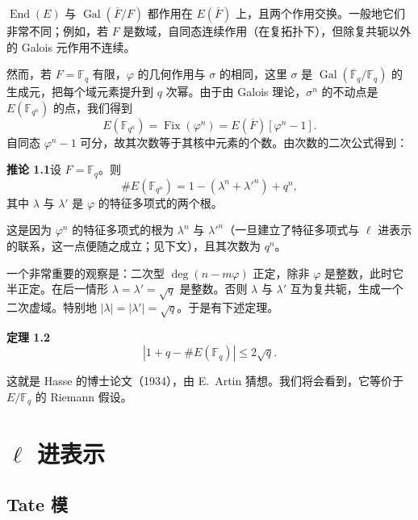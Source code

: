 $\operatorname{End}(E)$ 与 $\operatorname{Gal}(\overline{F}/F)$ 都作用在 $E(\overline{F})$ 上，且两个作用交换。一般地它们非常不同；例如，若 $F$ 是数域，自同态连续作用（在复拓扑下），但除复共轭以外的 Galois 元作用不连续。

然而，若 $F=\mathbb{F}_q$ 有限，$\varphi$ 的几何作用与 $\sigma$ 的相同，这里 $\sigma$ 是 $\operatorname{Gal}(\overline{\mathbb{F}}_q/\mathbb{F}_q)$ 的生成元，把每个域元素提升到 $q$ 次幂。由于由 Galois 理论，$\sigma^n$ 的不动点是 $E(\mathbb{F}_{q^n})$ 的点，我们得到
\begin{equation}\tag{1.13}\label{c5:eq:1.13}
E(\mathbb{F}_{q^n})=\operatorname{Fix}(\varphi^n)=E(\overline{F})[\varphi^n-1].
\end{equation}
自同态 $\varphi^n-1$ 可分，故其次数等于其核中元素的个数。由次数的二次公式得到：

\par\medskip\noindent\textbf{推论 1.1}\quad 设 $F=\mathbb{F}_q$。则
\begin{equation}\tag{1.14}\label{c5:eq:1.14}
\#E(\mathbb{F}_{q^n})=1-(\lambda^n+\lambda'^n)+q^n,
\end{equation}
其中 $\lambda$ 与 $\lambda'$ 是 $\varphi$ 的特征多项式的两个根。

这是因为 $\varphi^n$ 的特征多项式的根为 $\lambda^n$ 与 $\lambda'^n$（一旦建立了特征多项式与 $\ell$ 进表示的联系，这一点便随之成立；见下文），且其次数为 $q^n$。

一个非常重要的观察是：二次型 $\deg(n-m\varphi)$ 正定，除非 $\varphi$ 是整数，此时它半正定。在后一情形 $\lambda=\lambda'=\sqrt{q}$ 是整数。否则 $\lambda$ 与 $\lambda'$ 互为复共轭，生成一个二次虚域。特别地 $|\lambda|=|\lambda'|=\sqrt{q}$。于是有下述定理。

\par\medskip\noindent\textbf{定理 1.2}\quad
\begin{equation}\tag{1.15}\label{c5:eq:1.15}
|1+q-\#E(\mathbb{F}_q)|\le2\sqrt{q}.
\end{equation}

这就是 Hasse 的博士论文（1934），由 E.~Artin 猜想。我们将会看到，它等价于 $E/\mathbb{F}_q$ 的 Riemann 假设。

\section{$\ell$ 进表示}\label{c5:sec:2}

\subsection{Tate 模}\label{c5:sec:2.1}

